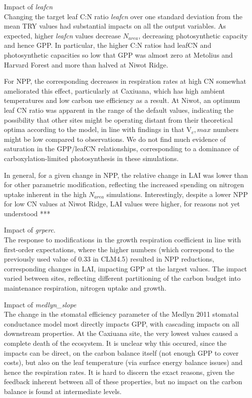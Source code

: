 \documentclass[draft,linenumbers]{agujournal}
\begin{document}
Impact of \emph{leafcn}\\
Changing the target leaf C:N ratio \emph{leafcn} over one standard deviation from the mean TRY values had substantial impacts on all the output variables.  As expected, higher \emph{leafcn} values decrease $N_{area}$, decreasing photosynthetic capacity and hence GPP.  In particular, the higher C:N ratios had leafCN and photosynthetic capacities so low that GPP was almost zero at Metolius and Harvard Forest and more than halved at Niwot Ridge.   

For NPP, the corresponding  decreases in respiration rates at high CN somewhat ameliorated this effect, particularly at Caxiuana, which has high ambient temperatures and low carbon use efficiency as a result.  At Niwot, an optimum leaf CN ratio was apparent in the range of the default values, indicating the possibility that other sites might be operating distant from their theoretical optima according to the model, in line with findings in \cite{lawrence} that V${_c,max}$ numbers might be low compared to observations. We do not find much evidence of saturation in the GPP/leafCN relationships, corresponding to a dominance of carboxylation-limited photosynthesis in these simulations. 

In general, for a given change in NPP, the relative change in LAI was lower than for other parametric modification, reflecting the increased spending on nitrogen uptake inherent in the high $N_{area}$ simulations. Interestingly, despite a lower NPP for low CN values at Niwot Ridge, LAI values were higher, for reasons not yet understood ***


Impact of \emph{grperc}.\\
The response to modifications in the growth respiration coefficient in line with first-order expectations, where the higher numbers (which correspond to the previously used value of 0.33 in CLM4.5) resulted in  NPP reductions, corresponding changes in LAI, impacting GPP at the largest values.   The impact varied between sites, reflecting different partitioning of the carbon budget into maintenance respiration, nitrogen uptake and growth. 

Impact of \emph{medlyn\_slope}\\
The change in the stomatal efficiency parameter of the Medlyn 2011 stomatal conductance model most directly impacts GPP, with cascading impacts on all downstream properties. At the Caxiuana site, the very lowest values caused a complete death of the ecosystem. It is unclear why this occured, since the impacts can be direct, on the carbon balance itself (not enough GPP to cover costs), but also on the leaf temperature (via surface energy balance issues) and hence the respiration rates. It is hard to discern the exact reasons, given the feedback inherent between all of these properties, but no impact on the carbon balance is found at intermediate levels.
\end{document}
